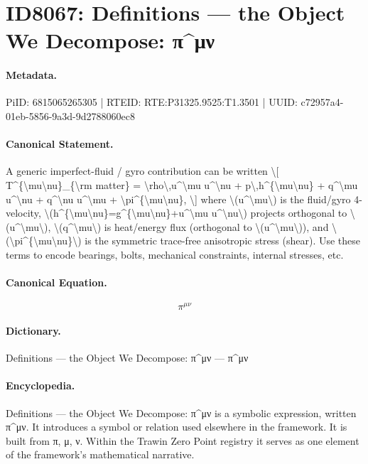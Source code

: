 \section*{ID8067: Definitions — the Object We Decompose: π\textasciicircum{}μν}
\paragraph{Metadata.}
PiID: 6815065265305 | RTEID: RTE:P31325.9525:T1.3501 | UUID: c72957a4-01eb-5856-9a3d-9d2788060ec8

\paragraph{Canonical Statement.}
A generic imperfect-fluid / gyro contribution can be written \textbackslash{}[ T\textasciicircum{}\{\textbackslash{}mu\textbackslash{}nu\}\_\{\textbackslash{}rm matter\} = \textbackslash{}rho\textbackslash{},u\textasciicircum{}\textbackslash{}mu u\textasciicircum{}\textbackslash{}nu + p\textbackslash{},h\textasciicircum{}\{\textbackslash{}mu\textbackslash{}nu\} + q\textasciicircum{}\textbackslash{}mu u\textasciicircum{}\textbackslash{}nu + q\textasciicircum{}\textbackslash{}nu u\textasciicircum{}\textbackslash{}mu + \textbackslash{}pi\textasciicircum{}\{\textbackslash{}mu\textbackslash{}nu\}, \textbackslash{}] where \textbackslash{}(u\textasciicircum{}\textbackslash{}mu\textbackslash{}) is the fluid/gyro 4-velocity, \textbackslash{}(h\textasciicircum{}\{\textbackslash{}mu\textbackslash{}nu\}=g\textasciicircum{}\{\textbackslash{}mu\textbackslash{}nu\}+u\textasciicircum{}\textbackslash{}mu u\textasciicircum{}\textbackslash{}nu\textbackslash{}) projects orthogonal to \textbackslash{}(u\textasciicircum{}\textbackslash{}mu\textbackslash{}), \textbackslash{}(q\textasciicircum{}\textbackslash{}mu\textbackslash{}) is heat/energy flux (orthogonal to \textbackslash{}(u\textasciicircum{}\textbackslash{}mu\textbackslash{})), and \textbackslash{}(\textbackslash{}pi\textasciicircum{}\{\textbackslash{}mu\textbackslash{}nu\}\textbackslash{}) is the symmetric trace-free anisotropic stress (shear). Use these terms to encode bearings, bolts, mechanical constraints, internal stresses, etc.

\paragraph{Canonical Equation.}
\[
\pi^{\mu\nu}
\]

\paragraph{Dictionary.}
Definitions — the Object We Decompose: π\textasciicircum{}μν — π\textasciicircum{}μν

\paragraph{Encyclopedia.}
Definitions — the Object We Decompose: π\textasciicircum{}μν is a symbolic expression, written π\textasciicircum{}μν. It introduces a symbol or relation used elsewhere in the framework. It is built from π, μ, ν. Within the Trawin Zero Point registry it serves as one element of the framework's mathematical narrative.
